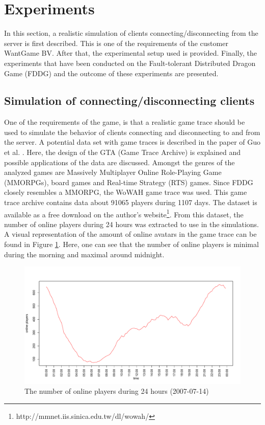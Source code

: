 \section{Experiments}
\label{sec:experiments}
	In this section, a realistic simulation of clients connecting/disconnecting from the server is first described. This is one of the requirements of the customer WantGame BV. After that, the experimental setup used is provided. Finally, the experiments that have been conducted on the Fault-tolerant Distributed Dragon Game (FDDG) and the outcome of these experiments are presented.
	
\subsection{Simulation of connecting/disconnecting clients}
\label{subsec:simulation_clients}
One of the requirements of the game, is that a realistic game trace should be used to simulate the behavior of clients connecting and disconnecting to and from the server.
A potential data set with game traces is described in the paper of Guo et al. \cite{guo2012game}.
Here, the design of the GTA (Game Trace Archive) is explained and possible applications of the data are discussed.
Amongst the genres of the analyzed games are Massively Multiplayer Online Role-Playing Game (MMORPGs), board games and Real-time Strategy (RTS) games. 
Since FDDG closely resembles a MMORPG, the WoWAH game trace \cite{lee2011world} was used.
This game trace archive contains data about 91065 players during 1107 days. The dataset is available as a free download on the author's website\footnote{http://mmnet.iis.sinica.edu.tw/dl/wowah/}.
From this dataset, the number of online players during 24 hours was extracted to use in the simulations. 
A visual representation of the amount of online avatars in the game trace can be found in Figure \ref{fig:online_players_plot}. Here, one can see that the number of online players is minimal during the morning and maximal around midnight.

\begin{figure}[h!]
  \centering
    \includegraphics[width=\textwidth]{images/online_players_plot}
    
  \caption{The number of online players during 24 hours (2007-07-14)}
  \label{fig:online_players_plot}
\end{figure}

